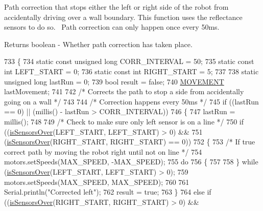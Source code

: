 Path correction that stops either the left or right side of the robot from accidentally driving over a wall boundary. This function uses the reflectance sensors to do so.~\newline
Path correction can only happen once every 50ms.

\begin{DoxyReturn}{Returns}
boolean -\/ Whether path correction has taken place. 
\end{DoxyReturn}

\begin{DoxyCode}
733 \{
734   \textcolor{keyword}{static} \textcolor{keyword}{const} \textcolor{keywordtype}{unsigned} \textcolor{keywordtype}{long} CORR\_INTERVAL = 50;
735   \textcolor{keyword}{static} \textcolor{keyword}{const} \textcolor{keywordtype}{int} LEFT\_START = 0;
736   \textcolor{keyword}{static} \textcolor{keyword}{const} \textcolor{keywordtype}{int} RIGHT\_START = 5;
737 
738   \textcolor{keyword}{static} \textcolor{keywordtype}{unsigned} \textcolor{keywordtype}{long} lastRun = 0;
739   \textcolor{keywordtype}{bool} result = \textcolor{keyword}{false};
740   \hyperlink{robotcode_8ino_adc716dd21485bffb9015eaeb3cfe6859}{MOVEMENT} lastMovement;
741 
742   \textcolor{comment}{/* Corrects the path to stop a side from accidentally going on a wall */}
743 
744   \textcolor{comment}{/* Correction happens every 50ms */}
745   \textcolor{keywordflow}{if} ((lastRun == 0) || (millis() - lastRun > CORR\_INTERVAL))
746   \{
747     lastRun = millis();
748 
749     \textcolor{comment}{/* Check to make sure only left sensor is on a line */}
750     \textcolor{keywordflow}{if} ((\hyperlink{robotcode_8ino_a7a14e59caf883ee2936af076b102c68e}{isSensorsOver}(LEFT\_START, LEFT\_START) > 0) &&
751         (\hyperlink{robotcode_8ino_a7a14e59caf883ee2936af076b102c68e}{isSensorsOver}(RIGHT\_START, RIGHT\_START) == 0))
752     \{
753       \textcolor{comment}{/* If true correct path by moving the robot right until not on line */}
754       motors.setSpeeds(MAX\_SPEED, -MAX\_SPEED);
755       \textcolor{keywordflow}{do}
756       \{
757 
758       \} \textcolor{keywordflow}{while} (\hyperlink{robotcode_8ino_a7a14e59caf883ee2936af076b102c68e}{isSensorsOver}(LEFT\_START, LEFT\_START) > 0);
759       motors.setSpeeds(MAX\_SPEED, MAX\_SPEED);
760 
761       Serial.println(\textcolor{stringliteral}{"Corrected left"});
762       result = \textcolor{keyword}{true};
763     \}
764     \textcolor{keywordflow}{else} \textcolor{keywordflow}{if} ((\hyperlink{robotcode_8ino_a7a14e59caf883ee2936af076b102c68e}{isSensorsOver}(RIGHT\_START, RIGHT\_START) > 0) &&

\end{DoxyCode}

